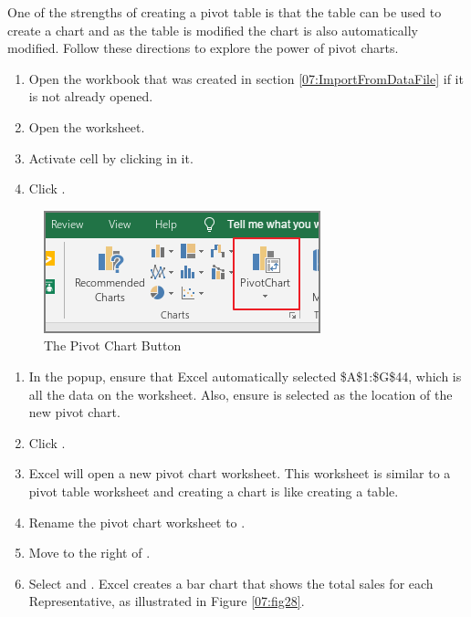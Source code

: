 One of the strengths of creating a pivot table is that the table can be used to create a chart and as the table is modified the chart is also automatically modified. Follow these directions to explore the power of pivot charts.

\begin{enumerate}
	\item Open the  workbook that was created in section \ref{07:ImportFromDataFile} if it is not already opened.
	\item Open the  worksheet.
	\item Activate cell  by clicking in it.  
	\item Click .
\end{enumerate}

\begin{figure}[H]
	\centering
	\includegraphics[width=\maxwidth{.95\linewidth}]{gfx/ch07_fig27}
	\caption{The Pivot Chart Button}
	\label{07:fig27}
\end{figure}

\begin{enumerate}[resume]	
	\item In the  popup, ensure that Excel automatically selected \$A\$1:\$G\$44, which is all the data on the worksheet. Also, ensure  is selected as the location of the new pivot chart.
	\item Click .
	\item Excel will open a new pivot chart worksheet. This worksheet is similar to a pivot table worksheet and creating a chart is like creating a table.
	\item Rename the pivot chart worksheet to . 
	\item Move  to the right of .
	\item Select  and . Excel creates a bar chart that shows the total sales for each Representative, as illustrated in Figure \ref{07:fig28}.
\end{enumerate}	

